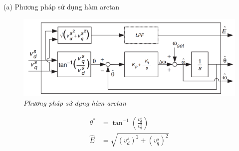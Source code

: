 \documentclass[11pt]{beamer}
\renewcommand{\label}[1]{%
			\gdef\sfname{sf:##1}}%
\begin{document}
	\begin{frame}[t]{(a) Phương pháp sử dụng hàm arctan}
		\begin{figure}[h]
			\includegraphics[width=1\textwidth]{Fig. 9 Method using arctangent function.PNG}
			\caption{\centering \textit{Phương pháp sử dụng hàm arctan}}\label{fig:Phương pháp sử dụng hàm arctan}
		\end{figure}
		\begin{align*}
			{\theta}^*&={\tan}^{-1} \left( {\frac{v_d^s}{v_q^s}} \right)\\
			\hat{E}&=\sqrt{{(v_d^s)^2}+{(v_q^s)^2}}
		\end{align*}
	
	\end{frame}
\end{document}
